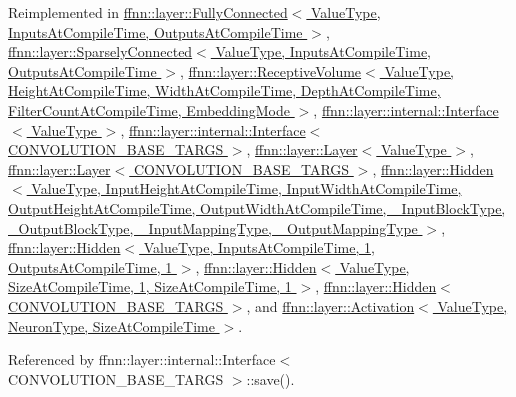 Reimplemented in \hyperlink{classffnn_1_1layer_1_1_fully_connected_a858f04f0752096d74e4d9876edb4c73e}{ffnn\-::layer\-::\-Fully\-Connected$<$ Value\-Type, Inputs\-At\-Compile\-Time, Outputs\-At\-Compile\-Time $>$}, \hyperlink{classffnn_1_1layer_1_1_sparsely_connected_aa8ae358e7cf06b58f3d33be2851d0260}{ffnn\-::layer\-::\-Sparsely\-Connected$<$ Value\-Type, Inputs\-At\-Compile\-Time, Outputs\-At\-Compile\-Time $>$}, \hyperlink{classffnn_1_1layer_1_1_receptive_volume_a9f813e0c5c60d572a296b8ec1fc25086}{ffnn\-::layer\-::\-Receptive\-Volume$<$ Value\-Type, Height\-At\-Compile\-Time, Width\-At\-Compile\-Time, Depth\-At\-Compile\-Time, Filter\-Count\-At\-Compile\-Time, Embedding\-Mode $>$}, \hyperlink{classffnn_1_1layer_1_1internal_1_1_interface_a417d6fda112fdffed8091b0ebd78ed97}{ffnn\-::layer\-::internal\-::\-Interface$<$ Value\-Type $>$}, \hyperlink{classffnn_1_1layer_1_1internal_1_1_interface_a417d6fda112fdffed8091b0ebd78ed97}{ffnn\-::layer\-::internal\-::\-Interface$<$ C\-O\-N\-V\-O\-L\-U\-T\-I\-O\-N\-\_\-\-B\-A\-S\-E\-\_\-\-T\-A\-R\-G\-S $>$}, \hyperlink{classffnn_1_1layer_1_1_layer_ac265fc929a178b111337226dd1cb62b6}{ffnn\-::layer\-::\-Layer$<$ Value\-Type $>$}, \hyperlink{classffnn_1_1layer_1_1_layer_ac265fc929a178b111337226dd1cb62b6}{ffnn\-::layer\-::\-Layer$<$ C\-O\-N\-V\-O\-L\-U\-T\-I\-O\-N\-\_\-\-B\-A\-S\-E\-\_\-\-T\-A\-R\-G\-S $>$}, \hyperlink{classffnn_1_1layer_1_1_hidden_a98305185267a0f7953f1b53c4bce4cf6}{ffnn\-::layer\-::\-Hidden$<$ Value\-Type, Input\-Height\-At\-Compile\-Time, Input\-Width\-At\-Compile\-Time, Output\-Height\-At\-Compile\-Time, Output\-Width\-At\-Compile\-Time, \-\_\-\-Input\-Block\-Type, \-\_\-\-Output\-Block\-Type, \-\_\-\-Input\-Mapping\-Type, \-\_\-\-Output\-Mapping\-Type $>$}, \hyperlink{classffnn_1_1layer_1_1_hidden_a98305185267a0f7953f1b53c4bce4cf6}{ffnn\-::layer\-::\-Hidden$<$ Value\-Type, Inputs\-At\-Compile\-Time, 1, Outputs\-At\-Compile\-Time, 1 $>$}, \hyperlink{classffnn_1_1layer_1_1_hidden_a98305185267a0f7953f1b53c4bce4cf6}{ffnn\-::layer\-::\-Hidden$<$ Value\-Type, Size\-At\-Compile\-Time, 1, Size\-At\-Compile\-Time, 1 $>$}, \hyperlink{classffnn_1_1layer_1_1_hidden_a98305185267a0f7953f1b53c4bce4cf6}{ffnn\-::layer\-::\-Hidden$<$ C\-O\-N\-V\-O\-L\-U\-T\-I\-O\-N\-\_\-\-B\-A\-S\-E\-\_\-\-T\-A\-R\-G\-S $>$}, and \hyperlink{classffnn_1_1layer_1_1_activation_ab5525e49c08fc593856b9c95e0eba1ee}{ffnn\-::layer\-::\-Activation$<$ Value\-Type, Neuron\-Type, Size\-At\-Compile\-Time $>$}.



Referenced by ffnn\-::layer\-::internal\-::\-Interface$<$ C\-O\-N\-V\-O\-L\-U\-T\-I\-O\-N\-\_\-\-B\-A\-S\-E\-\_\-\-T\-A\-R\-G\-S $>$\-::save().

